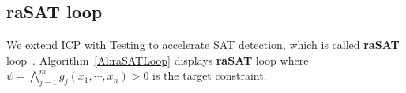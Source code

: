 \documentclass[runningheads,a4paper,oribibl]{llncs}
\begin{document}

\subsection{raSAT loop}

We extend ICP with Testing to accelerate SAT detection, which is called {\bf raSAT}
loop~\cite{VanKhanh201227}.  %
Algorithm~\ref{Al:raSATLoop} displays {\bf raSAT} loop where $\psi = \bigwedge\limits_{j=1}^mg_j(x_1, \cdots, x_n) > 0$ is the target constraint. 

\end{document}
